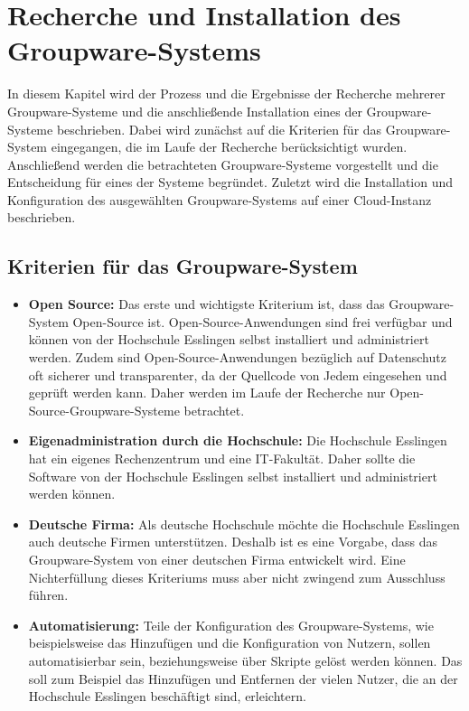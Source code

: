
\chapter{Recherche und Installation des Groupware-Systems}

In diesem Kapitel wird der Prozess und die Ergebnisse der Recherche mehrerer Groupware-Systeme und die anschließende Installation eines der Groupware-Systeme beschrieben.
Dabei wird zunächst auf die Kriterien für das Groupware-System eingegangen, die im Laufe der Recherche berücksichtigt wurden.
Anschließend werden die betrachteten Groupware-Systeme vorgestellt und die Entscheidung für eines der Systeme begründet.
Zuletzt wird die Installation und Konfiguration des ausgewählten Groupware-Systems auf einer Cloud-Instanz beschrieben.

\section{Kriterien für das Groupware-System}
\begin{itemize}
    \item \textbf{Open Source:} 
    Das erste und wichtigste Kriterium ist, dass das Groupware-System Open-Source ist.
    Open-Source-Anwendungen sind frei verfügbar und können von der Hochschule Esslingen selbst installiert und administriert werden.
    Zudem sind Open-Source-Anwendungen bezüglich auf Datenschutz oft sicherer und transparenter, da der Quellcode von Jedem eingesehen und geprüft werden kann.
    Daher werden im Laufe der Recherche nur Open-Source-Groupware-Systeme betrachtet.
    \item \textbf{Eigenadministration durch die Hochschule:}
    Die Hochschule Esslingen hat ein eigenes Rechenzentrum und eine IT-Fakultät.
    Daher sollte die Software von der Hochschule Esslingen selbst installiert und administriert werden können.
    \item \textbf{Deutsche Firma:}
    Als deutsche Hochschule möchte die Hochschule Esslingen auch deutsche Firmen unterstützen.
    Deshalb ist es eine Vorgabe, dass das Groupware-System von einer deutschen Firma entwickelt wird.
    Eine Nichterfüllung dieses Kriteriums muss aber nicht zwingend zum Ausschluss führen.
    \item \textbf{Automatisierung:}
    Teile der Konfiguration des Groupware-Systems, wie beispielsweise das Hinzufügen und die Konfiguration von Nutzern, sollen automatisierbar sein, beziehungsweise über Skripte gelöst werden können.
    Das soll zum Beispiel das Hinzufügen und Entfernen der vielen Nutzer, die an der Hochschule Esslingen beschäftigt sind, erleichtern.
\end{itemize}


